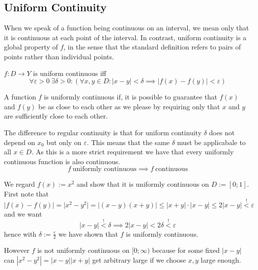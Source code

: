 \subsection{Uniform Continuity}
When we speak of a function being continuous on an interval, we mean only that it is continuous at each point of the interval.
In contrast, uniform continuity is a global property of \(f\), in the sense that the standard definition refers to pairs of points rather than individual points.
\begin{definition}
   \(f: D \to Y\) is uniform continuous iff
   \[\forall \varepsilon > 0~\exists \delta > 0: (\forall x,y \in D: |x - y| < \delta \implies |f(x) - f(y)| < \varepsilon)\]
\end{definition}
\begin{remark}[Intuition]
   A function \(f\) is uniformly continuous if, it is possible to guarantee that \(f(x)\) and \(f(y)\) be as close to each other as we please by requiring only that \(x\) and \(y\) are sufficiently close to each other.
\end{remark}
\begin{remark}
   The difference to regular continuity is that for uniform continuity \(\delta\) does not depend on \(x_0\) but only on \(\varepsilon\).
   This means that the same \(\delta\) must be applicabale to all \(x \in D\).
   As this is a more strict requirement we have that every uniformly continuous function is also continuous.
   \[f~\text{uniformly continuous} \implies f~\text{continuous}\]
\end{remark}
\begin{example}
   We regard \(f(x) := x^2\) and show that it is uniformly continuous on \(D := [0; 1]\).
   First note that
   \[\lvert f(x)-f(y)\rvert = \lvert x^2-y^2\rvert = \lvert (x-y)(x+y)\rvert \leq \lvert x+y\rvert \cdot \lvert x-y\rvert \leq 2\lvert x-y\rvert \overset{!}{<} \varepsilon\]
   and we want
   \[\lvert x-y\rvert \overset{!}{<} \delta \implies 2 \lvert x-y\rvert < 2 \delta \overset{!}{<} \varepsilon\]
   hence with \(\delta := \frac{\varepsilon}{2}\) we have shown that \(f\) is uniformly continuous.

   However \(f\) is not uniformly continuous on \([0; \infty)\) because for some fixed \(|x - y|\) can \(|x^2 - y^2| = |x - y||x + y|\) get arbitrary large if we choose \(x, y\) large enough.
\end{example}

